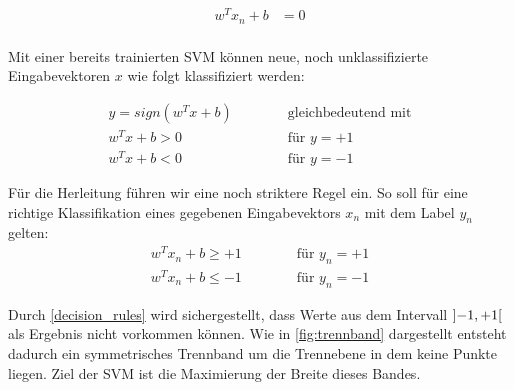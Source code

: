 \documentclass[a4paper,11pt,twoside]{scrreprt}
\begin{document}
\begin{equation} \label{plane_eq}
    \begin{aligned}
    w^{T} x_{n} + b &= 0 \\
    \end{aligned}
\end{equation}

Mit einer bereits trainierten \ac{SVM} können neue, noch unklassifizierte Eingabevektoren $x$ wie folgt klassifiziert werden:

\begin{subequations} \label{svm_classify1}
	\begin{alignat}{2}
		y = sign(w^{T} x + b)  & \qquad & \text{ gleichbedeutend mit} \\
		w^{T} x + b > 0 & & \text{ für } y = +1\\
		w^{T} x + b < 0 & & \text{ für } y = -1
	\end{alignat}
\end{subequations}


Für die Herleitung führen wir eine noch striktere Regel ein. So soll für eine richtige Klassifikation eines gegebenen Eingabevektors $x_{n}$ mit dem Label $y_{n}$ gelten:
\begin{subequations} \label{decision_rules}
	\begin{alignat}{2}
		w^{T} x_{n} + b \geq +1 & \qquad & \text{ für } y_{n} = +1\\
		w^{T} x_{n} + b \leq -1 & & \text{ für } y_{n} = -1
	\end{alignat}
\end{subequations}


Durch \autoref{decision_rules} wird sichergestellt, dass Werte aus dem Intervall $\interval[open]{-1}{+1}$ als Ergebnis nicht vorkommen können. Wie in \autoref{fig:trennband} dargestellt entsteht dadurch ein symmetrisches Trennband um die Trennebene in dem keine Punkte liegen. Ziel der \ac{SVM} ist die Maximierung der Breite dieses Bandes.\\
\end{document}

